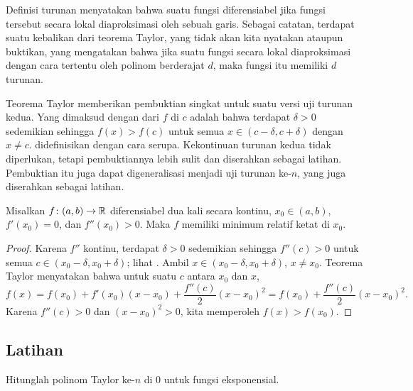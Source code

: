 \medskip

Definisi turunan menyatakan bahwa
suatu fungsi
diferensiabel jika fungsi tersebut
secara lokal diaproksimasi oleh sebuah garis.
Sebagai catatan, terdapat suatu kebalikan dari teorema
Taylor,
yang tidak akan kita nyatakan ataupun buktikan,
yang mengatakan bahwa jika suatu fungsi
secara lokal diaproksimasi dengan cara tertentu oleh polinom berderajat $d$, maka fungsi itu
memiliki $d$ turunan.

\medskip

Teorema Taylor memberikan pembuktian singkat untuk suatu versi
uji turunan kedua.
Yang dimaksud dengan \emph{}
dari $f$ di $c$
adalah bahwa terdapat $\delta > 0$ sedemikian sehingga $f(x) > f(c)$ untuk
semua $x \in (c-\delta,c+\delta)$ dengan $x\neq c$.
\emph{}
didefinisikan dengan cara serupa.
Kekontinuan turunan kedua tidak diperlukan, tetapi pembuktiannya lebih
sulit dan diserahkan sebagai latihan.  Pembuktian itu juga dapat digeneralisasi
menjadi uji turunan ke-$n$, yang juga diserahkan sebagai
latihan.

\begin{prop}
Misalkan $f \colon (a,b) \to {\mathbb{R}}$ diferensiabel dua kali secara kontinu,
$x_0 \in (a,b)$, $f'(x_0) = 0$, dan $f''(x_0) > 0$.  Maka $f$ memiliki minimum relatif
ketat di $x_0$.
\end{prop}

\begin{proof}
Karena $f''$ kontinu, terdapat $\delta > 0$
sedemikian sehingga $f''(c) > 0$ untuk semua $c \in (x_0-\delta,x_0+\delta)$;
lihat .
Ambil $x \in (x_0-\delta,x_0+\delta)$, $x \neq x_0$.
Teorema Taylor menyatakan bahwa untuk suatu $c$ antara $x_0$ dan $x$,
\begin{equation*}
f(x) 
=
f(x_0) + f'(x_0) (x-x_0) +
\frac{f''(c)}{2}{(x-x_0)}^{2} 
=
f(x_0) + \frac{f''(c)}{2}{(x-x_0)}^{2}  .
\end{equation*}
Karena $f''(c) > 0$ dan ${(x-x_0)}^2 > 0$, kita memperoleh $f(x) > f(x_0)$.
\end{proof}

\subsection{Latihan}

\begin{exercise}
Hitunglah polinom Taylor ke-$n$ di $0$ untuk fungsi eksponensial.
\end{exercise}

